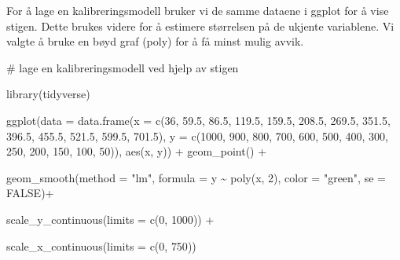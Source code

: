 \documentclass[
  letterpaper,
  DIV=11,
  numbers=noendperiod]{scrreprt}
\newenvironment{Shaded}{\begin{snugshade}}{\end{snugshade}}
\newcommand{\AttributeTok}[1]{\textcolor[rgb]{0.40,0.45,0.13}{#1}}
\newcommand{\CommentTok}[1]{\textcolor[rgb]{0.37,0.37,0.37}{#1}}
\newcommand{\ConstantTok}[1]{\textcolor[rgb]{0.56,0.35,0.01}{#1}}
\newcommand{\DecValTok}[1]{\textcolor[rgb]{0.68,0.00,0.00}{#1}}
\newcommand{\FloatTok}[1]{\textcolor[rgb]{0.68,0.00,0.00}{#1}}
\newcommand{\FunctionTok}[1]{\textcolor[rgb]{0.28,0.35,0.67}{#1}}
\newcommand{\NormalTok}[1]{\textcolor[rgb]{0.00,0.23,0.31}{#1}}
\newcommand{\SpecialCharTok}[1]{\textcolor[rgb]{0.37,0.37,0.37}{#1}}
\newcommand{\StringTok}[1]{\textcolor[rgb]{0.13,0.47,0.30}{#1}}
\begin{document}
For å lage en kalibreringsmodell bruker vi de samme dataene i ggplot for
å vise stigen. Dette brukes videre for å estimere størrelsen på de
ukjente variablene. Vi valgte å bruke en bøyd graf (poly) for å få minst
mulig avvik.

\begin{Shaded}
\begin{Highlighting}[]
\CommentTok{\# lage en kalibreringsmodell ved hjelp av stigen}

\FunctionTok{library}\NormalTok{(tidyverse)}

\FunctionTok{ggplot}\NormalTok{(}\AttributeTok{data =} \FunctionTok{data.frame}\NormalTok{(}\AttributeTok{x =} \FunctionTok{c}\NormalTok{(}\DecValTok{36}\NormalTok{, }\FloatTok{59.5}\NormalTok{, }\FloatTok{86.5}\NormalTok{,}
                              \FloatTok{119.5}\NormalTok{, }\FloatTok{159.5}\NormalTok{, }\FloatTok{208.5}\NormalTok{,}
                              \FloatTok{269.5}\NormalTok{, }\FloatTok{351.5}\NormalTok{, }\FloatTok{396.5}\NormalTok{,}
                              \FloatTok{455.5}\NormalTok{, }\FloatTok{521.5}\NormalTok{, }\FloatTok{599.5}\NormalTok{, }\FloatTok{701.5}\NormalTok{), }
                         \AttributeTok{y =} \FunctionTok{c}\NormalTok{(}\DecValTok{1000}\NormalTok{, }\DecValTok{900}\NormalTok{, }\DecValTok{800}\NormalTok{, }
                            \DecValTok{700}\NormalTok{, }\DecValTok{600}\NormalTok{, }\DecValTok{500}\NormalTok{, }
                            \DecValTok{400}\NormalTok{, }\DecValTok{300}\NormalTok{, }\DecValTok{250}\NormalTok{, }
                            \DecValTok{200}\NormalTok{, }\DecValTok{150}\NormalTok{, }\DecValTok{100}\NormalTok{, }\DecValTok{50}\NormalTok{)), }
       \FunctionTok{aes}\NormalTok{(x, y)) }\SpecialCharTok{+} \FunctionTok{geom\_point}\NormalTok{() }\SpecialCharTok{+}
  
  \FunctionTok{geom\_smooth}\NormalTok{(}\AttributeTok{method =} \StringTok{"lm"}\NormalTok{, }\AttributeTok{formula =}\NormalTok{ y }\SpecialCharTok{\textasciitilde{}} \FunctionTok{poly}\NormalTok{(x, }\DecValTok{2}\NormalTok{), }
                    \AttributeTok{color =} \StringTok{"green"}\NormalTok{, }\AttributeTok{se =} \ConstantTok{FALSE}\NormalTok{)}\SpecialCharTok{+}
  
  \FunctionTok{scale\_y\_continuous}\NormalTok{(}\AttributeTok{limits =} \FunctionTok{c}\NormalTok{(}\DecValTok{0}\NormalTok{, }\DecValTok{1000}\NormalTok{)) }\SpecialCharTok{+}
  
  \FunctionTok{scale\_x\_continuous}\NormalTok{(}\AttributeTok{limits =} \FunctionTok{c}\NormalTok{(}\DecValTok{0}\NormalTok{, }\DecValTok{750}\NormalTok{))}
\end{Highlighting}
\end{Shaded}
\end{document}

